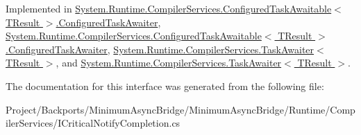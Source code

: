 Implemented in \hyperlink{struct_system_1_1_runtime_1_1_compiler_services_1_1_configured_task_awaitable_1_1_configured_task_awaiter_ab8514ee763a005be7b0fc9af50705861}{System.\+Runtime.\+Compiler\+Services.\+Configured\+Task\+Awaitable$<$ T\+Result $>$.\+Configured\+Task\+Awaiter}, \hyperlink{struct_system_1_1_runtime_1_1_compiler_services_1_1_configured_task_awaitable_1_1_configured_task_awaiter_ab8514ee763a005be7b0fc9af50705861}{System.\+Runtime.\+Compiler\+Services.\+Configured\+Task\+Awaitable$<$ T\+Result $>$.\+Configured\+Task\+Awaiter}, \hyperlink{struct_system_1_1_runtime_1_1_compiler_services_1_1_task_awaiter_af057913665b7968eeb237cca41d1ac73}{System.\+Runtime.\+Compiler\+Services.\+Task\+Awaiter$<$ T\+Result $>$}, and \hyperlink{struct_system_1_1_runtime_1_1_compiler_services_1_1_task_awaiter_af057913665b7968eeb237cca41d1ac73}{System.\+Runtime.\+Compiler\+Services.\+Task\+Awaiter$<$ T\+Result $>$}.



The documentation for this interface was generated from the following file\+:\begin{DoxyCompactItemize}
\item 
Project/\+Backports/\+Minimum\+Async\+Bridge/\+Minimum\+Async\+Bridge/\+Runtime/\+Compiler\+Services/I\+Critical\+Notify\+Completion.\+cs\end{DoxyCompactItemize}
